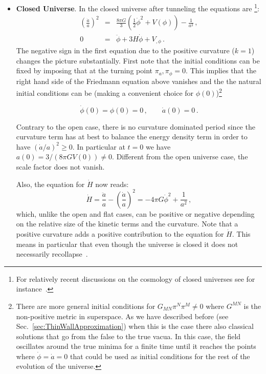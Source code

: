 \documentclass[a4paper,11pt]{article}
\numberwithin{equation}{section}
\begin{document}
\begin{itemize}
 \item {\bf Closed Universe}. 
In the closed universe after tunneling the equations are \footnote{For relatively recent discussions on the cosmology of closed universes see for instance~\cite{White:1995qm, Ellis:2001ym, Linde:2003hc, Uzan:2003nk, Lasenby:2003ur, Masso:2006gv, Bonga:2016iuf, Ratra:2017ezv}.}:
\begin{eqnarray}
 \left(\frac{\dot a}{a}\right)^2 & =&\frac{8\pi G}{3}\left(\frac{1}{2}\dot\phi^2+V(\phi)\right)-\frac{1}{a^2} \,,\\
0&=&\ddot{\phi}+3H\dot\phi  +V_{,\phi} \,. \nonumber
\label{eqn:fieldcosmology}
\end{eqnarray}
 The negative sign in the first equation due to the positive curvature ($k=1$) changes the picture substantially. First note that the initial conditions can be fixed by imposing that at the turning point  $\pi_a,\pi_\phi=0$. This implies that the right hand side of the Friedmann equation above vanishes and the the natural initial conditions can be (making a convenient choice for $\phi(0)$)\footnote{There are  more general initial conditions for  $G_{MN}\pi^N\pi^M\neq 0$ where $G^{MN}$ is the non-positive metric in superspace. As we have described before (see Sec.~\ref{sec:ThinWallApproximation}) when this is the case there also classical solutions that go from the false to the true vacua.  In this case,  the field oscillates around the true minima for a finite time until it reaches the points where $\dot\phi=\dot a=0$ that could be used as initial conditions for the rest of the evolution of the universe.}
 
\begin{equation}
\dot\phi(0)=\phi(0)=0\,, \qquad  \dot a(0)=0\,. 
\label{initial}
\end{equation}

Contrary to the open case, there is no curvature dominated period since the curvature term has at best  to balance the energy density term in order to have $(\dot a/a)^2\geq 0$. In particular at $t=0$ we have $a(0)=3/(8\pi G V(0))\neq 0$. Different from the open universe case, the scale factor does not vanish.

Also, the equation for $\dot H$ now reads:
\begin{equation}
 \dot H=\frac{\ddot a}{ a} -\left(\frac{\dot a}{a}\right)^2=-4\pi G \dot\phi^2 +\frac{1}{a^2} \,,
 \label{acceleration2}
 \end{equation}
which, unlike the open and flat cases, can be positive or negative depending on the relative size of the kinetic terms and the curvature. Note that a positive curvature adds a positive contribution to the equation for $\dot H$. This means in particular that even though the universe is closed it does not necessarily recollapse~\cite{Barrow:1988xi}.


\end{itemize}
\end{document}
